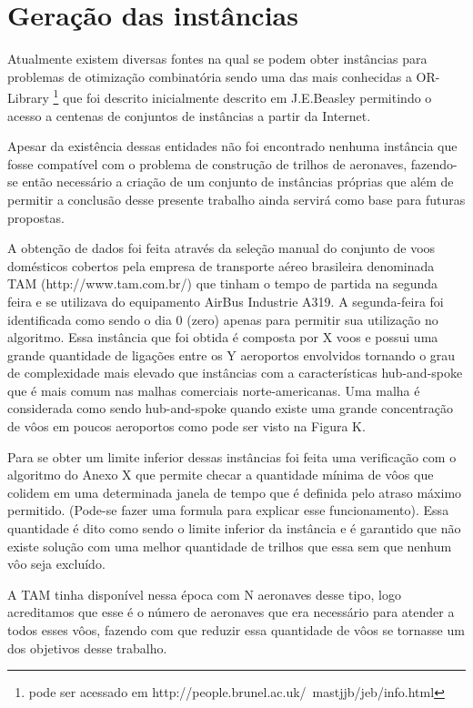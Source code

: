 \chapter{Geração das instâncias}
  
  Atualmente existem diversas fontes na qual se podem obter instâncias para problemas de otimização combinatória sendo uma das mais conhecidas a OR-Library \footnote{ pode ser acessado em http://people.brunel.ac.uk/~mastjjb/jeb/info.html} que foi descrito inicialmente descrito em J.E.Beasley \cite{orlibrary} permitindo o acesso a centenas de conjuntos de instâncias a partir da Internet. 
  
Apesar da existência dessas entidades não foi encontrado nenhuma instância que fosse compatível com o problema de construção de trilhos de aeronaves, fazendo-se então necessário a criação de um conjunto de instâncias próprias que além de permitir a conclusão desse presente trabalho ainda servirá como base para futuras propostas.
  
A obtenção de dados foi feita através da seleção manual do conjunto de voos domésticos cobertos pela empresa de transporte aéreo brasileira denominada TAM (http://www.tam.com.br/) que tinham o tempo de partida na segunda feira e se utilizava do equipamento AirBus Industrie A319. A segunda-feira foi identificada como sendo o dia 0 (zero) apenas para permitir sua utilização no algoritmo. Essa instância que foi obtida é composta por X voos e possui uma grande quantidade de ligações entre os Y aeroportos envolvidos tornando o grau de complexidade mais elevado que instâncias com a características hub-and-spoke que é mais comum nas malhas comerciais norte-americanas. Uma malha é considerada como sendo hub-and-spoke quando existe uma grande concentração de vôos em poucos aeroportos como pode ser visto na Figura K.
  
Para se obter um limite inferior dessas instâncias foi feita uma verificação com o algoritmo do Anexo X que permite checar a quantidade mínima de vôos que colidem em uma determinada janela de tempo que é definida pelo atraso máximo permitido. (Pode-se fazer uma formula para explicar esse funcionamento). Essa quantidade é dito como sendo o limite inferior da instância e é garantido que não existe solução com uma melhor quantidade de trilhos que essa sem que nenhum vôo seja excluído.
  
	A TAM tinha disponível nessa época com N aeronaves desse tipo, logo acreditamos que esse é o número de aeronaves que era necessário para atender a todos esses vôos, fazendo com que reduzir essa quantidade de vôos se tornasse um dos objetivos desse trabalho.
  
